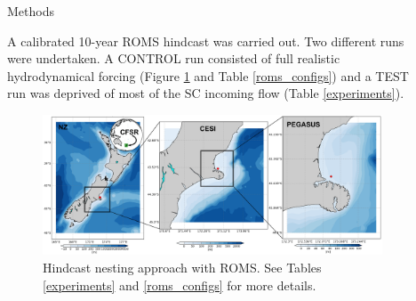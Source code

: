 \documentclass[final]{beamer}
\newlength{\sepwid}
\newlength{\onecolwid}
\newlength{\twocolwid}
\begin{document}
\begin{frame}[t]
\begin{columns}[t]
\begin{column}{\onecolwid}

\end{column} %

\begin{column}{\sepwid}\end{column} %

\begin{column}{\twocolwid} %

    \begin{columns}[t,totalwidth=\twocolwid] %

        \begin{column}{\onecolwid}\vspace{-.6in} %


            \begin{block}{Methods}

            A calibrated 10-year ROMS hindcast was carried out. Two different runs were undertaken. A CONTROL run consisted of full realistic hydrodynamical forcing (Figure \ref{domains} and Table \ref{roms_configs}) and a TEST run was deprived of most of the SC incoming flow (Table \ref{experiments}).  

            \begin{figure}
            \includegraphics[width=1.0\linewidth]{domains.png}
            \caption{\label{domains} Hindcast nesting approach with ROMS. See Tables \ref{experiments} and \ref{roms_configs} for more details.}
            \end{figure}


\end{block}
\end{column}
\end{columns}
\end{column}
\end{columns}
\end{frame}
\end{document}
